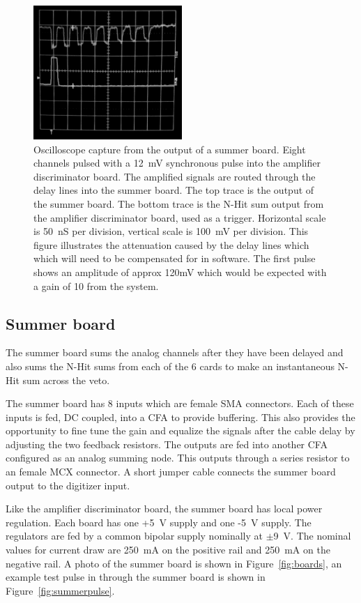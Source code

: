 \documentclass[review,number,sort&compress]{elsarticle}
\begin{document}
\begin{figure}[ht]
\begin{center}
	\includegraphics[height=2in, keepaspectratio=true]{graphics/delaypulse_bw.jpg}
	\caption{Oscilloscope capture from the output of a summer board. Eight channels
		pulsed with a 12~mV synchronous pulse into the amplifier discriminator board. The amplified
		signals are routed through the delay lines into the summer board. The top trace is
		the output of the summer board. The bottom trace is the N-Hit sum output from the
		amplifier discriminator board, used as a trigger. Horizontal scale is 50~nS per division,
		vertical scale is 100~mV per division. This figure illustrates the attenuation caused by the delay
		lines which which will need to be compensated for in software. The first pulse shows an amplitude of approx 120mV which would be expected with a gain of 10 from the system.
\label{fig:multipulse}}
\end{center}
\end{figure}

\subsection{Summer board}
\label{sec:Sum}
%
The summer board sums the analog channels after they have been delayed
and also sums the N-Hit sums from each of the 6 cards to make an
instantaneous N-Hit sum across the veto. 

The summer board has 8 inputs which are female SMA connectors. Each of
these inputs is fed, DC coupled, into a CFA to provide buffering. This
also provides the opportunity to fine tune the gain and equalize the
signals after the cable delay by adjusting the two feedback resistors.
The outputs are fed into another CFA configured as an analog summing
node. This outputs through a series resistor to an female MCX
connector. A short jumper cable connects the summer board output to
the digitizer input.  

Like the amplifier discriminator board, the summer board has local
power regulation.  Each board has one +5~V supply and one -5~V supply.
The regulators are fed by a common bipolar supply nominally at
$\pm$9~V.  The nominal values for current draw are 250~mA on the
positive rail and 250~mA on the negative rail.  A photo of the summer
board is shown in Figure~\ref{fig:boards}, an example test pulse in
through the summer board is shown in Figure~\ref{fig:summerpulse}.
\end{document}
